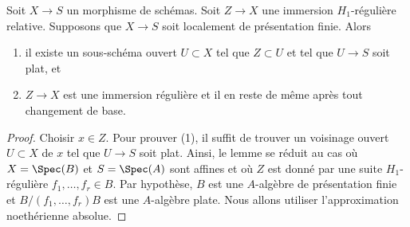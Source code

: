 \begin{lemma}
\label{lemma-flat-relative-H1-regular}
Soit  $X \to S$  un morphisme de schémas. Soit  $Z \to X$  une immersion
 $H_1$-régulière relative. Supposons que  $X \to S$  soit localement de
présentation finie. Alors
\begin{enumerate}
\item il existe un sous-schéma ouvert  $U \subset X$  tel que  $Z \subset U$  et tel que
 $U \to S$  soit plat, et
\item $Z \to X$  est une immersion régulière et il en reste de même après tout
changement de base.
\end{enumerate}
\end{lemma}

\begin{proof}
Choisir  $x \in Z$. Pour prouver (1), il suffit de trouver un voisinage ouvert
 $U \subset X$  de  $x$  tel que  $U \to S$  soit plat. Ainsi, le lemme se
réduit au cas où  $X = \Spec(B)$  et  $S = \Spec(A)$  sont affines et où  $Z$  est
donné par une suite  $H_1$-régulière  $f_1, \ldots, f_r \in B$. Par hypothèse,
 $B$  est une  $A$-algèbre de présentation finie et  $B/(f_1, \ldots, f_r)B$ 
est une  $A$-algèbre plate. Nous allons utiliser l'approximation
noethérienne absolue.


\end{proof}
